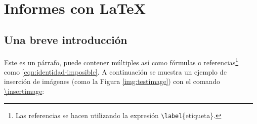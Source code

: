 %
%

\section{Informes con \LaTeX}

\subsection{Una breve introducción}
	
	Este es un párrafo, puede contener múltiples  así como fórmulas o referencias\footnote{Las referencias se hacen utilizando la expresión \texttt{\textbackslash label}\{etiqueta\}.} como \eqref{eqn:identidad-imposible}. A continuación se muestra un ejemplo de inserción de imágenes (como la Figura \ref{img:testimage}) con el comando \href{https://template-latex.github.io/informe.html#hlp-imagen}{\textbackslash insertimage}:


